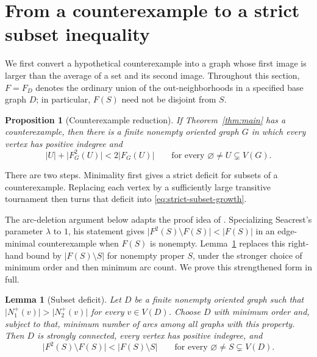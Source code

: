 \documentclass[11pt]{article}
\newtheorem{lemma}[theorem]{Lemma}
\newtheorem{proposition}[theorem]{Proposition}
\theoremstyle{remark}
\newcommand{\abs}[1]{\lvert #1\rvert}
\begin{document}
\section{From a counterexample to a strict subset inequality}
\label{sec:reduction}

We first convert a hypothetical counterexample into a graph whose first
image is larger than the average of a set and its second image.  Throughout
this section, $F=F_D$ denotes the ordinary union of the out-neighborhoods
in a specified base graph $D$; in particular, $F(S)$ need not be disjoint
from $S$.

\begin{proposition}[Counterexample reduction]
\label{prop:counterexample-reduction}
If Theorem~\ref{thm:main} has a counterexample, then there is a finite
nonempty oriented graph $G$ in which every vertex has positive indegree
and
\begin{equation}
\label{eq:strict-subset-growth}
  \abs{U}+\abs{F_G^2(U)}<2\abs{F_G(U)}
  \qquad\text{for every }\varnothing\ne U\subsetneq V(G).
\end{equation}
\end{proposition}

There are two steps.  Minimality first gives a strict deficit for subsets
of a counterexample.  Replacing each vertex by a sufficiently large
transitive tournament then turns that deficit into
\eqref{eq:strict-subset-growth}.

The arc-deletion argument below adapts the proof idea of
\cite[Lemma~4]{Seacrest2019}.  Specializing Seacrest's parameter $\lambda$
to $1$, his statement gives
$\abs{F^2(S)\setminus F(S)}<\abs{F(S)}$ in an edge-minimal
counterexample when $F(S)$ is nonempty.  Lemma~\ref{lem:subset-deficit}
replaces this right-hand bound by $\abs{F(S)\setminus S}$ for nonempty
proper $S$, under the stronger choice of minimum order and then minimum
arc count.  We prove this strengthened form in full.

\begin{lemma}[Subset deficit]
\label{lem:subset-deficit}
Let $D$ be a finite nonempty oriented graph such that
$\abs{N_1^+(v)}>\abs{N_2^+(v)}$ for every $v\in V(D)$.
Choose $D$ with minimum order and, subject to that, minimum number of
arcs among all graphs with this property.  Then $D$ is strongly connected,
every vertex has positive indegree, and
\begin{equation}
\label{eq:subset-deficit}
  \abs{F^2(S)\setminus F(S)}<\abs{F(S)\setminus S}
  \qquad\text{for every }\varnothing\ne S\subsetneq V(D).
\end{equation}
\end{lemma}
\end{document}
